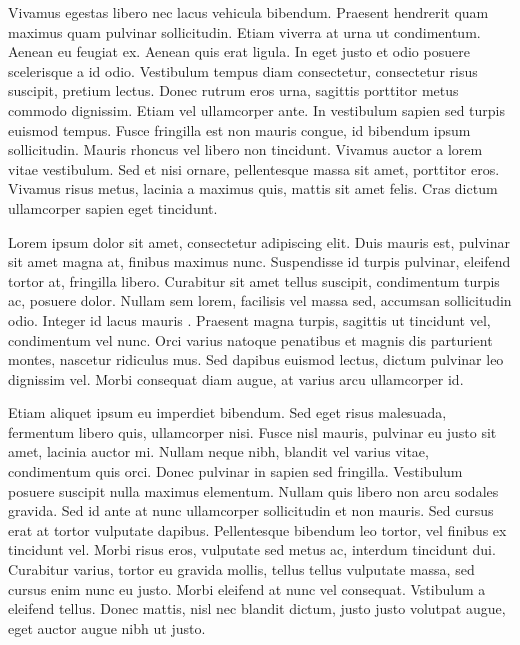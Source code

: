 \documentclass{luagost-7-32}
\begin{document}
\sloppy

\essay

Vivamus egestas libero nec lacus vehicula bibendum.
Praesent hendrerit quam maximus quam pulvinar sollicitudin.
Etiam viverra at urna ut condimentum.
Aenean eu feugiat ex.
Aenean quis erat ligula.
In eget justo et odio posuere scelerisque a id odio.
Vestibulum tempus diam consectetur, consectetur risus suscipit, pretium lectus.
Donec rutrum eros urna, sagittis porttitor metus commodo dignissim.
Etiam vel ullamcorper ante.
In vestibulum sapien sed turpis euismod tempus.
Fusce fringilla est non mauris congue, id bibendum ipsum sollicitudin.
Mauris rhoncus vel libero non tincidunt.
Vivamus auctor a lorem vitae vestibulum.
Sed et nisi ornare, pellentesque massa sit amet, porttitor eros.
Vivamus risus metus, lacinia a maximus quis, mattis sit amet felis.
Cras dictum ullamcorper sapien eget tincidunt.

\newpage
\tableofcontents

\newpage
\introduction

Lorem ipsum dolor sit amet, consectetur adipiscing elit.
Duis mauris est, pulvinar sit amet magna at, finibus maximus nunc.
Suspendisse id turpis pulvinar, eleifend tortor at, fringilla libero.
Curabitur sit amet tellus suscipit, condimentum turpis ac, posuere dolor.
Nullam sem lorem, facilisis vel massa sed, accumsan sollicitudin odio.
Integer id lacus mauris \cite{bib:pomerance}.
Praesent magna turpis, sagittis ut tincidunt vel, condimentum vel nunc.
Orci varius natoque penatibus et magnis dis parturient montes, nascetur ridiculus mus.
Sed dapibus euismod lectus, dictum pulvinar leo dignissim vel.
Morbi consequat diam augue, at varius arcu ullamcorper id.

Etiam aliquet ipsum eu imperdiet bibendum.
Sed eget risus malesuada, fermentum libero quis, ullamcorper nisi.
Fusce nisl mauris, pulvinar eu justo sit amet, lacinia auctor mi.
Nullam neque nibh, blandit vel varius vitae, condimentum quis orci.
Donec pulvinar in sapien sed fringilla.
Vestibulum posuere suscipit nulla maximus elementum.
Nullam quis libero non arcu sodales gravida.
Sed id ante at nunc ullamcorper sollicitudin et non mauris.
Sed cursus erat at tortor vulputate dapibus.
Pellentesque bibendum leo tortor, vel finibus ex tincidunt vel.
Morbi risus eros, vulputate sed metus ac, interdum tincidunt dui.
Curabitur varius, tortor eu gravida mollis, tellus tellus vulputate massa, sed cursus enim nunc eu justo.
Morbi eleifend at nunc vel consequat.
Vstibulum a eleifend tellus.
Donec mattis, nisl nec blandit dictum, justo justo volutpat augue, eget auctor augue nibh ut justo.
\end{document}
